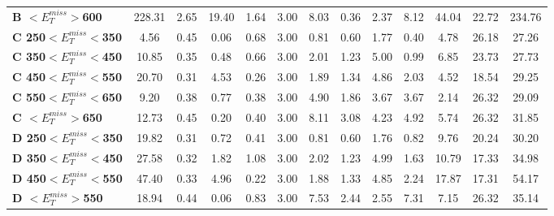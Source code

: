 \begin{table}[h]
\begin{center}
{\begin{tabular}{|l|cccccccccccc|}
\textbf{ B $<E_T^{miss}>$600}    & 228.31        & 2.65          & 19.40         & 1.64          & 3.00          & 8.03          & 0.36          & 2.37          & 8.12          & 44.04         & 22.72         & 234.76        \\
\textbf{ C 250$<E_T^{miss}<$350}         & 4.56          & 0.45          & 0.06          & 0.68          & 3.00          & 0.81          & 0.60          & 1.77          & 0.40          & 4.78          & 26.18         & 27.26         \\
\textbf{ C 350$<E_T^{miss}<$450}         & 10.85         & 0.35          & 0.48          & 0.66          & 3.00          & 2.01          & 1.23          & 5.00          & 0.99          & 6.85          & 23.73         & 27.73         \\
\textbf{ C 450$<E_T^{miss}<$550}         & 20.70         & 0.31          & 4.53          & 0.26          & 3.00          & 1.89          & 1.34          & 4.86          & 2.03          & 4.52          & 18.54         & 29.25         \\
\textbf{ C 550$<E_T^{miss}<$650}         & 9.20          & 0.38          & 0.77          & 0.38          & 3.00          & 4.90          & 1.86          & 3.67          & 3.67          & 2.14          & 26.32         & 29.09         \\
\textbf{ C $<E_T^{miss}>$650}    & 12.73         & 0.45          & 0.20          & 0.40          & 3.00          & 8.11          & 3.08          & 4.23          & 4.92          & 5.74          & 26.32         & 31.85         \\
\textbf{ D 250$<E_T^{miss}<$350}         & 19.82         & 0.31          & 0.72          & 0.41          & 3.00          & 0.81          & 0.60          & 1.76          & 0.82          & 9.76          & 20.24         & 30.20         \\
\textbf{ D 350$<E_T^{miss}<$450}         & 27.58         & 0.32          & 1.82          & 1.08          & 3.00          & 2.02          & 1.23          & 4.99          & 1.63          & 10.79         & 17.33         & 34.98         \\
\textbf{ D 450$<E_T^{miss}<$550}         & 47.40         & 0.33          & 4.96          & 0.22          & 3.00          & 1.88          & 1.33          & 4.85          & 2.24          & 17.87         & 17.31         & 54.17         \\
\textbf{ D $<E_T^{miss}>$550}    & 18.94         & 0.44          & 0.06          & 0.83          & 3.00          & 7.53          & 2.44          & 2.55          & 7.31          & 7.15          & 26.32         & 35.14         \\

\end{tabular}}
\end{center}
\end{table}
